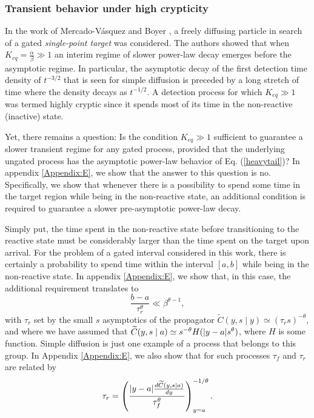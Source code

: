 \subsubsection{Transient behavior under high crypticity}

In the work of Mercado-Vásquez and Boyer \cite{mercado2019first}, a freely diffusing particle in search of a gated \textit{single-point target} was considered. The authors showed that when $K_{eq} = \frac{\alpha}{\beta} \gg 1$ an interim regime of slower power-law decay emerges before the asymptotic regime. In particular, the asymptotic decay of the first detection time density of $t^{-3/2}$ that is seen for simple diffusion is preceded by a long stretch of time where the density decays as $t^{-1/2}$.  A detection process for which $K_{eq} \gg 1$ was termed highly cryptic since it spends most of its time in the non-reactive (inactive) state.

Yet, there remains a question: Is the condition $K_{eq} \gg 1$ sufficient to guarantee a slower transient regime for any gated process, provided that the underlying ungated process has the asymptotic power-law behavior of Eq. (\ref{heavytail})? In appendix \ref{Appendix:E}, we show that the answer to this question is no. Specifically, we show that whenever there is a possibility to spend some time in the target region while being in the non-reactive state, an additional condition is required to guarantee a slower pre-asymptotic power-law decay. 

Simply put, the time spent in the non-reactive state before transitioning to the reactive state must be considerably larger than the time spent on the target upon arrival. For the problem of a gated interval considered in this work, there is certainly a probability to spend time within the interval $[a,b]$ while being in the non-reactive state. In appendix \ref{Appendix:E}, we show that, in this case, the additional requirement translates to
%
\begin{equation} \label{crypric1}
 \frac{b-a}{\tau_r^\theta} \ll \beta^{\theta-1} ,
\end{equation}
%
with $\tau_r$ set by the small $s$ asymptotics of the propagator $\widetilde{C}(y,s\mid y) \simeq (\tau_r s)^{-\theta} $, and where we have assumed that $\widetilde{C}(y,s\mid a) \simeq s^{-\theta} H(\vert{y-a}\vert s^\theta)$, where $H$ is some function. Simple diffusion is just one example of a process that belongs to this group. In Appendix \ref{Appendix:E}, we also show that for such processes $\tau_f$ and $\tau_r$ are related by
%
\begin{equation} \label{taus_relation}
\tau_r = \left(\frac{\vert{y-a}\vert \frac{d\widetilde{C}(y,s\mid a)}{dy}}{\tau_f^{\theta}}\right)_{y=a} ^{-1/\theta}.
\end{equation}

